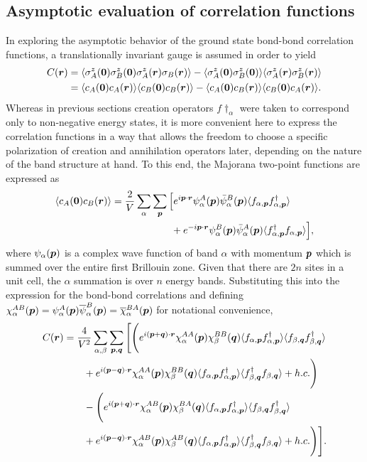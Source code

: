 \subsection{Asymptotic evaluation of correlation functions}
\label{section:chapter07_BondBondNumerics}
%
%
In exploring the asymptotic behavior of the ground state bond-bond correlation functions, a translationally invariant gauge is assumed in order to yield
%
\begin{align}
	C(\bm{r})	&= \langle \sigma_A^z(\bm{0}) \sigma_B^z(\bm{0}) \sigma_A^z(\bm{r}) \sigma_B(\bm{r}) \rangle - \langle \sigma_A^z(\bm{0}) \sigma_B^z(\bm{0}) \rangle \langle \sigma_A^z(\bm{r}) \sigma_B^z(\bm{r}) \rangle \nonumber\\
			&= \langle c_A(\bm{0}) c_A(\bm{r}) \rangle \langle c_B(\bm{0}) c_B(\bm{r}) \rangle - \langle c_A(\bm{0}) c_B(\bm{r}) \rangle \langle c_B(\bm{0}) c_A(\bm{r}) \rangle.
\end{align}
%
Whereas in previous sections creation operators $f\dag_{\alpha}$ were taken to correspond only to non-negative energy states, it is more convenient here to express the correlation functions in a way that allows the freedom to choose a specific polarization of creation and annihilation operators later, depending on the nature of the band structure at hand.
To this end, the Majorana two-point functions are expressed as
%
\begin{align}
	\langle c_A(\bm{0}) c_B(\bm{r}) \rangle &= \frac{2}{V} \sum_{\alpha} \sum_{\bm{p}} \Big[ e^{i \bm{p} \cdot \bm{r}} \psi_{\alpha}^A(\bm{p}) \bar{\psi}_{\alpha}^B(\bm{p}) \langle f_{\alpha, \bm{p}} f^{\dagger}_{\alpha, \bm{p}} \rangle \nonumber\\
							&\qquad\qquad\qquad+ e^{-i \bm{p} \cdot \bm{r}} \psi_{\alpha}^B(\bm{p}) \bar{\psi}_{\alpha}^A(\bm{p}) \langle f^{\dagger}_{\alpha, \bm{p}} f_{\alpha, \bm{p}} \rangle \Big],
\end{align}
%
where $\psi_{\alpha}(\bm{p})$ is a complex wave function of band $\alpha$ with momentum $\bm{p}$ which is summed over the entire first Brillouin zone.
Given that there are $2n$ sites in a unit cell, the $\alpha$ summation is over $n$ energy bands.
Substituting this into the expression for the bond-bond correlations and defining $\chi_{\alpha}^{AB}(\bm{p}) = \psi_{\alpha}^A(\bm{p}) \overline{\psi}_{\alpha}^B(\bm{p}) = \overline{\chi}_{\alpha}^{BA}(\bm{p})$ for notational convenience,
%
\begin{align}
	C(\bm{r})	&= \frac{4}{V^2} \sum_{\alpha, \beta} \sum_{\bm{p}, \bm{q}} \Bigg[ \Bigg(e^{i (\bm{p} + \bm{q}) \cdot \bm{r}} \chi_{\alpha}^{AA}(\bm{p}) \chi_{\beta}^{BB}(\bm{q}) \langle f_{\alpha, \bm{p}} f^{\dagger}_{\alpha, \bm{p}} \rangle \langle f_{\beta, \bm{q}} f^{\dagger}_{\beta, \bm{q}} \rangle \nonumber \\
			&\qquad+ e^{i (\bm{p} - \bm{q}) \cdot \bm{r}} \chi_{\alpha}^{AA}(\bm{p}) \chi_{\beta}^{BB}(\bm{q}) \langle f_{\alpha, \bm{p}} f^{\dagger}_{\alpha, \bm{p}} \rangle \langle f^{\dagger}_{\beta, \bm{q}} f_{\beta, \bm{q}} \rangle + h.c. \Bigg) \nonumber \\
			&\qquad- \Bigg(e^{i (\bm{p} + \bm{q}) \cdot \bm{r}} \chi_{\alpha}^{AB}(\bm{p}) \chi_{\beta}^{BA}(\bm{q}) \langle f_{\alpha, \bm{p}} f^{\dagger}_{\alpha, \bm{p}} \rangle \langle f_{\beta, \bm{q}} f^{\dagger}_{\beta, \bm{q}} \rangle \nonumber \\
			&\qquad+ e^{i (\bm{p} - \bm{q}) \cdot \bm{r}} \chi_{\alpha}^{AB}(\bm{p}) \chi_{\beta}^{AB}(\bm{q}) \langle f_{\alpha, \bm{p}} f^{\dagger}_{\alpha, \bm{p}} \rangle \langle f^{\dagger}_{\beta, \bm{q}} f_{\beta, \bm{q}} \rangle + h.c. \Bigg) \Bigg].
	\label{eq:chapter07_BondBondFull}
\end{align}
